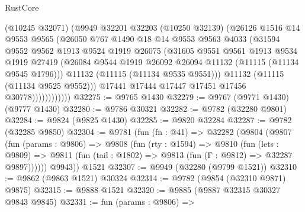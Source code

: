 \begin{lexlean}{RustCore}
\begin{coremodule}
                      (@10245 @32071)
                      (@9949
                        @32201
                        @32203
                        (@10250 @32139)
                        (@26126
                          @1516
                          @14
                          @9553
                          @9565
                          (@26050
                            @767
                            @1490
                            @18
                            @14
                            @9553
                            @9563
                            @4033
                            (@31594
                              @9552
                              @9562
                              @1913
                              @9524
                              @1919
                              @26075
                              (@31605
                                @9551
                                @9561
                                @1913
                                @9534
                                @1919
                                @27419
                                (@26084
                                  @9544
                                  @1919
                                  @26092
                                  @26094
                                  @11132
                                  (@11115 (@11134 @9545 @1796)))
                                @11132
                                (@11115 (@11134 @9535 @9551)))
                              @11132
                              (@11115 (@11134 @9525 @9552)))
                            @17441
                            @17444
                            @17447
                            @17451
                            @17456
                            @30778))))))))))))
@32275 := @9765 @1430
@32279 := @9767 (@9771 @1430) (@9777 @1430)
@32280 := @9786 @30321
@32282 := @9782 (@32280 @9801)
@32284 := @9824 (@9825 @1430)
@32285 := @9820 @32284
@32287 := @9782 (@32285 @9850)
@32304 := @9781
    (fun (fn : @41) =>
    @32282
      (@9804
        (@9807
          (fun (params : @9806) =>
          @9808
            (fun (rty : @1594) =>
            @9810
              (fun (lets : @9809) =>
              @9811 (fun (tail : @1802) => @9813 (fun (Γ : @9812) => @32287 @9897))))))
        @9943))
    @1521
@32307 := @9949 (@32280 (@9799 @1521))
@32310 := @9862 (@9863 @1521) @30324
@32314 := @9782 (@9854 (@32310 @9871) @9875)
@32315 := @9888 @1521
@32320 := @9885 (@9887 @32315 @30327 @9843 @9845)
@32331 := fun (params : @9806) =>

\end{coremodule}
\end{lexlean}
